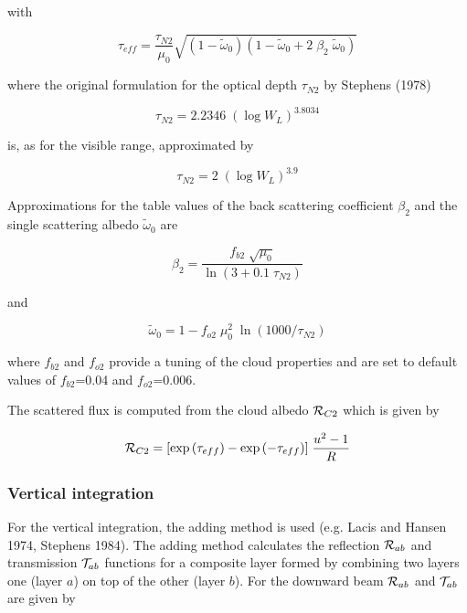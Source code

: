 with

\begin{equation}
\tau_{eff}=\frac{\tau_{N2}}{\mu_0}\sqrt{(1-
\tilde{\omega}_0)(1-\tilde{\omega}_0 + 2 \; \beta_2 \;
\tilde{\omega}_0)}
\end{equation}

where the original formulation for the optical depth
$\tau_{N2}$ by Stephens (1978)

\begin{equation}
\tau_{N2}=2.2346 \; (\log{W_L})^{3.8034}
\end{equation}

is, as for the visible range, approximated by

\begin{equation}
\tau_{N2}= 2 \; (\log{W_L})^{3.9}
\end{equation}

Approximations for the table values of the back
scattering coefficient $\beta_2$ and the single
scattering albedo $\tilde{\omega}_0$ are

\begin{equation}
\beta_2=\frac{f_{b2}\; \sqrt{\mu_0}}{\ln{(3+0.1\;
\tau_{N2})}}
\end{equation}

and

\begin{equation}
\tilde{\omega}_0=1-
f_{o2}\;\mu_0^2\;\ln{(1000/\tau_{N2})}
\end{equation}

where $f_{b2}$ and $f_{o2}$ provide a tuning of the
cloud
properties and are set to default values of $f_{b2}$=0.04
and $f_{o2}$=0.006. 

The scattered flux is computed from the cloud albedo
${\cal R}_{C2}$ which is given by

\begin{equation}
{\cal R}_{C2}=[\exp{(\tau_{eff})}-\exp{(-\tau_{eff})}]
\; \frac{u^2-
1}{R}
\end{equation}
 


\subsubsection*{Vertical integration}

For the vertical integration, the adding method is used
(e.g. Lacis and Hansen 1974, Stephens  1984). The
adding method calculates the reflection ${\cal R}_{ab}$
and transmission ${\cal T}_{ab}$  functions for a
composite layer formed by combining two layers one
(layer $a$) on top of the other (layer $b$). For the
downward beam ${\cal R}_{ab}$ and ${\cal T}_{ab}$ are given by

